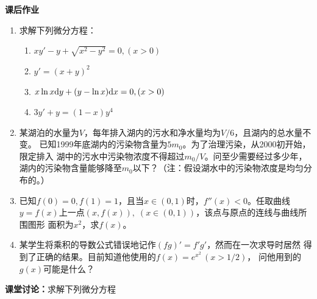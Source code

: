 \begin{ext}
	{\bf 课后作业}
	
	\begin{enumerate}
	  \item 求解下列微分方程：
	  \begin{enumerate}[(1)]
	    \item $xy'-y+\sqrt{x^2-y^2}=0,(x>0)$
	    \item $y'=(x+y)^2$
	    \item $x\ln x\mathrm{d} y+(y-\ln x)\mathrm{d} x=0,(x>0)$ 
	    \item $3y'+y=(1-x)y^4$
	  \end{enumerate}
	  \item 某湖泊的水量为$V$，每年排入湖内的污水和净水量均为$V/6$，且湖内的总水量不变。
	  已知1999年底湖内的污染物含量为$5m_0$。为了治理污染，从2000初开始，限定排入
	  湖中的污水中污染物浓度不得超过$m_0/V$。问至少需要经过多少年，
	  湖内的污染物含量能够降至$m_0$以下？（注：假设湖水中的污染物浓度是均匀分布的。）
	  \item 已知$f(0)=0,f(1)=1$，且当$x\in(0,1)$时，$f''(x)<0$。任取曲线
	  $y=f(x)$上一点$(x,f(x)),\;(x\in(0,1))$，该点与原点的连线与曲线所围图形
	  面积为$x^2$，求$f(x)$。
	  \item 某学生将乘积的导数公式错误地记作$(fg)'=f'g'$，然而在一次求导时居然
	  得到了正确的结果。目前知道他使用的$f(x)=e^{x^2}\,(x>1/2)$，
	  问他用到的$g(x)$可能是什么？
	\end{enumerate}
\end{ext}

{\bf 课堂讨论：}求解下列微分方程

